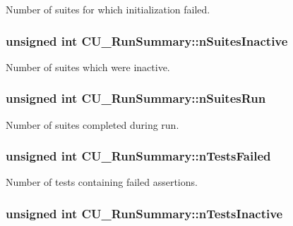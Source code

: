 Number of suites for which initialization failed. 

\hypertarget{structCU__RunSummary_a08b166bdf14cc18cbfa77a47fb911904}{
\subsubsection[{n\-Suites\-Inactive}]{\setlength{\rightskip}{0pt plus 5cm}unsigned int C\-U\-\_\-\-Run\-Summary\-::n\-Suites\-Inactive}}\label{structCU__RunSummary_a08b166bdf14cc18cbfa77a47fb911904}


Number of suites which were inactive. 

\hypertarget{structCU__RunSummary_ae426617945d15652562f4d2b5d243f51}{
\subsubsection[{n\-Suites\-Run}]{\setlength{\rightskip}{0pt plus 5cm}unsigned int C\-U\-\_\-\-Run\-Summary\-::n\-Suites\-Run}}\label{structCU__RunSummary_ae426617945d15652562f4d2b5d243f51}


Number of suites completed during run. 

\hypertarget{structCU__RunSummary_a3a3be4dfb55ceffdb2ffacdac9796d24}{
\subsubsection[{n\-Tests\-Failed}]{\setlength{\rightskip}{0pt plus 5cm}unsigned int C\-U\-\_\-\-Run\-Summary\-::n\-Tests\-Failed}}\label{structCU__RunSummary_a3a3be4dfb55ceffdb2ffacdac9796d24}


Number of tests containing failed assertions. 

\hypertarget{structCU__RunSummary_ae6a7f6466d38db9adc3dae4b8cf89699}{
\subsubsection[{n\-Tests\-Inactive}]{\setlength{\rightskip}{0pt plus 5cm}unsigned int C\-U\-\_\-\-Run\-Summary\-::n\-Tests\-Inactive}}\label{structCU__RunSummary_ae6a7f6466d38db9adc3dae4b8cf89699}


